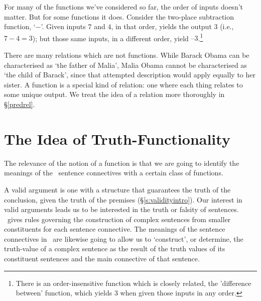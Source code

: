 For many of the functions we've considered so far, the order of inputs doesn't matter. But for some functions it does. Consider the two-place subtraction function, `$-$'. Given inputs $7$ and $4$, in that order, yields the output $3$ (i.e., $7-4=3$); but those same inputs, in a different order, yield $–3$.\footnote{There is an order-insensitive function which is closely related, the 'difference between' function, which yields $3$ when given those inputs in any order.}

There are many relations which are not functions. While Barack Obama can be characterised as `the father of Malia', Malia Obama cannot be characterised as `the child of Barack', since that attempted description would apply equally to her sister. A function is a special kind of relation: one where each thing relates to some unique output. We treat the idea of a relation more thoroughly in §\ref{predrel}.

\section{The Idea of Truth-Functionality}\label{idea_tf}

The relevance of the notion of a function is that we are going to identify the meanings of the \TFL\ sentence connectives with a certain class of functions.

A valid argument is one with a structure that guarantees the truth of the conclusion, given the truth of the premises (§\ref{s:validityintro}). Our interest in valid arguments leads us to be interested in the truth or falsity of sentences. \TFL\ gives rules governing the construction of complex sentences from smaller constituents for each sentence connective. The meanings of the sentence connectives in \TFL\ are likewise going to allow us to `construct', or determine, the truth-value of a complex sentence as the result of the truth values of its constituent sentences and the main connective of that sentence. 

